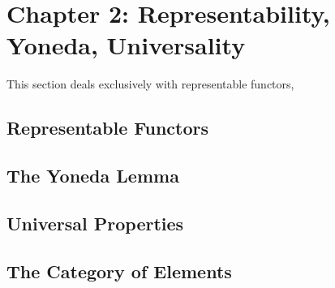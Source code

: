 \section{Chapter 2: Representability, Yoneda, Universality}

This section deals exclusively with representable functors,
\subsection{Representable Functors}

\subsection{The Yoneda Lemma}

\subsection{Universal Properties}

\subsection{The Category of Elements}